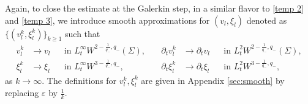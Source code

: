 \documentclass[letterpaper,reqno,10pt,twoside]{amsart}
\theoremstyle{definition}
\theoremstyle{remark}
\begin{document}
	Again, to close the estimate at the Galerkin step, in a similar flavor to \eqref{temp 2} and \eqref{temp 3}, we introduce smooth approximations for $(v_{l},\xi_{l})$ denoted as
	$\{(v_{l}^{k},\xi_{l}^{k})\}_{k\ge1}$ such that
	\[
	\begin{aligned}
		v_{l}^{k} &\to v_{l}
		&&\text{in } L_{t}^{\infty}W^{2-\frac{1}{q_{-}},q_{-}}(\Sigma),
		&\quad
		\partial_{t}v_{l}^{k} &\to \partial_{t}v_{l}
		&&\text{in } L_{t}^{2}W^{2-\frac{1}{q_{-}},q_{-}}(\Sigma),
		\\
		\xi_{l}^{k} &\to \xi_{l}
		&&\text{in } L_{t}^{\infty}W^{3-\frac{1}{q_{-}},q_{-}},
		&\quad
		\partial_{t}\xi_{l}^{k} &\to \partial_{t}\xi_{l}
		&&\text{in } L_{t}^{2}W^{3-\frac{1}{q_{-}},q_{-}},
	\end{aligned}
	\]
	as $k\to\infty$. The definitions for $v_{l}^{k},\xi_{l}^{k}$ are given in Appendix \ref{sec:smooth} by replacing $\varepsilon$ by $\frac{1}{k}$. 
	
\end{document}
